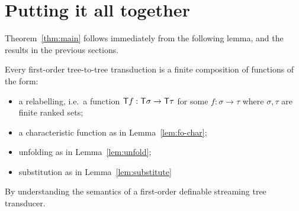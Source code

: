 \section{Putting it all together}


Theorem~\ref{thm:main} follows immediately from the following lemma, and the results in the previous sections.

\begin{lemma}
    Every first-order tree-to-tree transduction is a finite composition of functions of the form:
    \begin{itemize}
        \item a relabelling, i.e.~a function $\mathsf T f : \mathsf T \sigma \to \mathsf T \tau$ for some $f : \sigma \to \tau$ where $\sigma,\tau$ are finite ranked sets;
        \item a characteristic function as in Lemma~\ref{lem:fo-char};
        \item unfolding as in Lemma~\ref{lem:unfold};
        \item substitution as in Lemma~\ref{lem:substitute}
    \end{itemize}
\end{lemma}
\begin{pr}
    By understanding the semantics of a first-order definable streaming tree transducer.
\end{pr}  